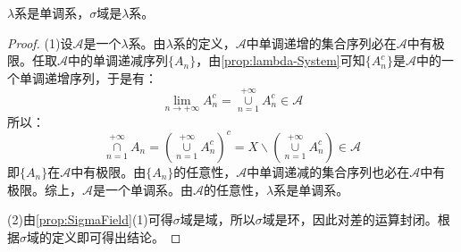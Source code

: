 \begin{theorem}\label{theo:SetNecessarilySet2}
	$\lambda$系是单调系，$\sigma$域是$\lambda$系。
\end{theorem}
\begin{proof}
	(1)设$\mathscr{A}$是一个$\lambda$系。由$\lambda$系的定义，$\mathscr{A}$中单调递增的集合序列必在$\mathscr{A}$中有极限。任取$\mathscr{A}$中的单调递减序列$\{A_n\}$，由\cref{prop:lambda-System}可知$\{A_n^c\}$是$\mathscr{A}$中的一个单调递增序列，于是有：
	\begin{equation*}
		\lim_{n\to+\infty}A_n^c=\underset{n=1}{\overset{+\infty}{\cup}}A_n^c\in\mathscr{A}
	\end{equation*}
	所以：
	\begin{equation*}
		\underset{n=1}{\overset{+\infty}{\cap}}A_n=\left(\underset{n=1}{\overset{+\infty}{\cup}}A_n^c\right)^c=X\backslash\left(\underset{n=1}{\overset{+\infty}{\cup}}A_n^c\right)\in\mathscr{A}
	\end{equation*}
	即$\{A_n\}$在$\mathscr{A}$中有极限。由$\{A_n\}$的任意性，$\mathscr{A}$中单调递减的集合序列也必在$\mathscr{A}$中有极限。综上，$\mathscr{A}$是一个单调系。由$\mathscr{A}$的任意性，$\lambda$系是单调系。\par
	(2)由\cref{prop:SigmaField}(1)可得$\sigma$域是域，所以$\sigma$域是环，因此对差的运算封闭。根据$\sigma$域的定义即可得出结论。
\end{proof}
